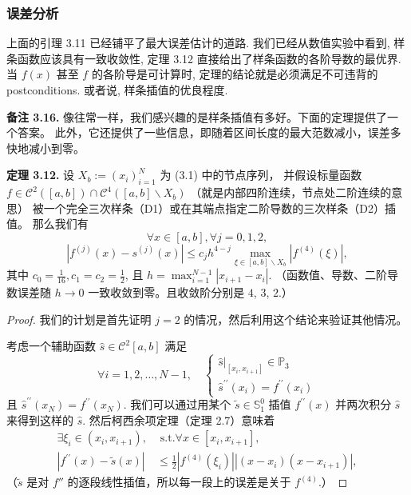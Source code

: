 \documentclass[a4paper]{ctexart}
\begin{document}
{\subsubsection{误差分析}

上面的引理 3.11 已经铺平了最大误差估计的道路. 我们已经从数值实验中看到,
样条函数应该具有一致收敛性, 定理 3.12 直接给出了样条函数的各阶导数的最优界. 
当 $f(x)$ 甚至 $f$ 的各阶导是可计算时, 定理的结论就是必须满足不可违背的 
postconditions. 或者说, 样条插值的优良程度. 

\noindent \textbf{备注 3.16.} 像往常一样，我们感兴趣的是样条插值有多好。下面的定理提供了一个答案。
此外，它还提供了一些信息，即随着区间长度的最大范数减小，误差多快地减小到零。

\noindent \textbf{定理 3.12.} 设 $X_{b}:=\left(x_{i}\right)_{i=1}^{N}$ 为 (3.1) 中的节点序列，
并假设标量函数 $f\in\mathcal{C}^{2}([a, b])\cap\mathcal{C}^{4}\left([a, b]\backslash X_{b}\right)$ （就是内部四阶连续，节点处二阶连续的意思）
被一个完全三次样条（D1）或在其端点指定二阶导数的三次样条（D2）插值。
那么我们有
\[
\forall x\in[a, b],\forall j = 0, 1, 2,
\]
\[
\left|f^{(j)}(x)-s^{(j)}(x)\right|\leq c_{j} h^{4-j}\max_{\xi\in[a, b]\backslash X_{b}}\left|f^{(4)}(\xi)\right|,\tag{3.20}
\]
其中 $c_{0}=\frac{1}{16}, c_{1}=c_{2}=\frac{1}{2}$, 且 $h=\max_{i=1}^{N-1}\left|x_{i+1}-x_{i}\right|$. 
（函数值、导数、二阶导数误差随 $h \to 0$ 一致收敛到零。且收敛阶分别是 $4$, $3$, $2$.）

\begin{proof} 
我们的计划是首先证明 $j = 2$ 的情况，然后利用这个结论来验证其他情况。

考虑一个辅助函数 $\hat{s}\in\mathcal{C}^{2}[a, b]$ 满足
\[
\forall i = 1, 2, \ldots, N - 1,\quad 
\left\{\begin{array}{l}\left.\hat{s}\right|_{\left[x_i, x_{i + 1}\right]}\in \mathbb{P}_3\\
   \hat{s}^{\prime\prime}\left(x_i\right) = f^{\prime\prime}\left(x_i\right)\end{array}
\right.
\]
且 $\hat{s}^{\prime\prime}\left(x_{N}\right) = f^{\prime\prime}\left(x_{N}\right)$. 
我们可以通过用某个 $\tilde{s}\in \mathbb{S}_{1}^{0}$ 插值 $f^{\prime\prime}(x)$ 并两次积分 $\hat{s}$ 来得到这样的 $\hat{s}$. 
然后柯西余项定理（定理 2.7）意味着
\begin{align*}
\exists\xi_{i}\in\left(x_{i}, x_{i+1}\right),&\text{ s.t.}\forall x\in\left[x_{i}, x_{i+1}\right],\\
\left|f^{\prime\prime}(x)-\tilde{s}(x)\right|&\leq\frac{1}{2}\left|f^{(4)}\left(\xi_{i}\right)\right|\left|\left(x-x_{i}\right)\left(x-x_{i+1}\right)\right|,
\end{align*}
（$\tilde{s}$ 是对 $f''$ 的逐段线性插值，所以每一段上的误差是关于 $f^{(4)}$.）


\end{proof}}
\end{document}
